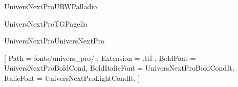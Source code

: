%
%
%
%
%
%
%

%
%

\def\ChooseFont{UniversNextPro}
\def\FontURWPalladio{URWPalladio}
\def\FontTGPagella{TGPagella}
\def\FontUniversNextPro{UniversNextPro}

\ifx\ChooseFont\FontURWPalladio
   \usepackage[sc]{mathpazo}
   \linespread{1.05}                %

   \usepackage[T1]{fontenc}         %
   \usepackage[utf8]{inputenc}      %
\fi

\ifx\ChooseFont\FontTGPagella
   \usepackage{tgpagella}

   \usepackage[T1]{fontenc}         %
   \usepackage[utf8]{inputenc}      %
\fi

%
\ifx\ChooseFont\FontUniversNextPro
   \usepackage{fontspec}

   \setmainfont{UniversNextProLightCond}[
      Path = fonts/univers_pro/ ,
      Extension = .ttf ,
      BoldFont = UniversNextProBoldCond,
      BoldItalicFont = UniversNextProBoldCondIt,
      ItalicFont = UniversNextProLightCondIt,
   ]
\fi


